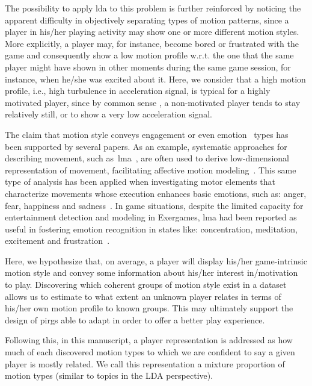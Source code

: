 The possibility to apply \gls{lda} to this problem is further reinforced by noticing the apparent difficulty in objectively separating types of motion patterns, since a player in his/her playing activity may show one or more different motion styles. More explicitly, a player may, for instance, become bored or frustrated with the game and consequently show a low motion profile w.r.t. the one that the same player might have shown in other moments during the same game session, for instance, when he/she was excited about it. Here, we consider that a high motion profile, i.e., high turbulence in acceleration signal, is typical for a highly motivated player, since by common sense %
, a non-motivated player {tends} to stay relatively still, or to show a very low acceleration signal.

The claim that motion style conveys engagement or even emotion~\cite{aristidou_emotion_2015,shafir_emotion_2016,tsachor_somatic_2017} types has been supported by several papers. As an example, systematic approaches for describing movement, such as~\gls{lma}~\cite{laban_language_1974}, are often used to derive low-dimensional representation of movement, facilitating affective motion modeling~\cite{burton_laban_2016}. This same type of analysis has been applied when investigating motor elements that characterize movements whose execution enhances basic emotions, such as: anger, fear, happiness and sadness~\cite{shafir_emotion_2016}. In game situations, despite the limited capacity for entertainment detection and modeling in Exergames, \gls{lma} had been reported as useful in fostering emotion recognition in states like: concentration, meditation, excitement and frustration~\cite{zacharatos_emotion_2013}.

Here, we hypothesize that, on average, a player will display his/her game-intrinsic motion style and convey some information about his/her interest in/motivation to play. Discovering which coherent groups of motion style exist in a dataset allows us to estimate to what extent an unknown player relates in terms of his/her own motion profile to known groups. This may ultimately support the design of \gls{pirg}s able to adapt in order to offer a better play experience.

Following this, in this manuscript, a player representation is addressed as how much of each discovered motion types to which we are confident to say a given player is mostly related. %
We call this representation a {mixture proportion of motion types} (similar to topics in the LDA perspective). 

